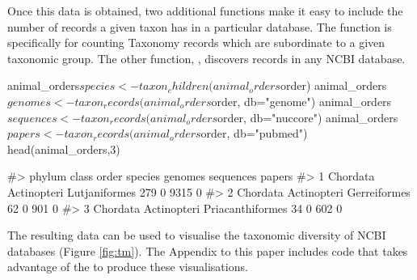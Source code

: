 Once this data is obtained, two additional functions make it easy to include the
number of records a given taxon has in a particular database. The function
 is specifically for counting Taxonomy records which are
subordinate to a given taxonomic group. The other function,  , 
discovers records in any NCBI database.

\begin{example}
animal_orders$species <- taxon_children(animal_orders$order)
animal_orders$genomes <- taxon_records(animal_orders$order, db="genome")
animal_orders$sequences <- taxon_records(animal_orders$order, db="nuccore")
animal_orders$papers <- taxon_records(animal_orders$order, db="pubmed")
head(animal_orders,3)

#>     phylum       class            order species genomes sequences papers
#> 1 Chordata Actinopteri    Lutjaniformes     279       0      9315      0
#> 2 Chordata Actinopteri     Gerreiformes      62       0       901      0
#> 3 Chordata Actinopteri Priacanthiformes      34       0       602      0
\end{example}

The resulting data can be used to visualise the taxonomic diversity of NCBI 
databases (Figure \ref{fig:tm}). The Appendix to this paper 
includes code that takes advantage of the  \citep{treemap} to 
produce these visualisations. 

